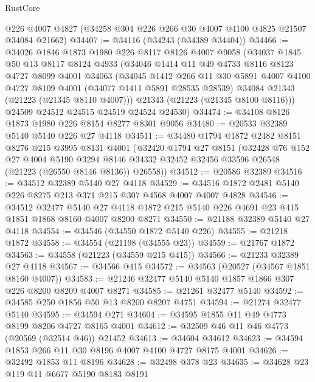 \begin{lexlean}{RustCore}
\begin{coremodule}
    @226
    @4007
    @4827
    (@34258 @304 @226 @266 @30 @4007 @4100 @4825 @21507 @34084 @21662)
@34407 := @34116 (@34243 (@34389 @34404))
@34466 := @34026
    @1846
    @1873
    @1980
    @226
    @8117
    @8126
    @4007
    @9058
    (@34037
      @1845
      @50
      @13
      @8117
      @8124
      @4933
      (@34046
        @1414
        @11
        @49
        @4733
        @8116
        @8123
        @4727
        @8099
        @4001
        @34063
        (@34045
          @1412
          @266
          @11
          @30
          @5891
          @4007
          @4100
          @4727
          @8109
          @4001
          (@34077 @1411 @5891 @28535 @28539)
          @34084
          @21343
          (@21223 (@21345 @8110 @4007)))
        @21343
        (@21223 (@21345 @8100 @8116)))
      @24509
      @24512
      @24515
      @24519
      @24524
      @24530)
@34474 := @34108 @8126 @1873 @1980 @226 @8154 @8277 @8301 @9056
@34480 := @20533 @32389 @5140 @5140 @226 @27 @4118
@34511 := @34480
    @1794
    @1872
    @2482
    @8151
    @8276
    @215
    @3995
    @8131
    @4001
    (@32420
      @1794
      @27
      @8151
      (@32428
        @76
        @152
        @27
        @4004
        @5190
        @3294
        @8146
        @34332
        @32452
        @32456
        @33596
        @26548
        (@21223 (@26550 @8146 @8136))
        @26558))
@34512 := @20586 @32389
@34516 := @34512 @32389 @5140 @27 @4118
@34529 := @34516 @1872 @2481 @5140 @226 @8275 @213 @371 @215 @307 @4568 @4007 @4007 @4828
@34546 := @34512
    @32477
    @5140
    @27
    @4118
    @1872
    @215
    @5140
    @226
    @4691
    @23
    @415
    @1851
    @1868
    @8160
    @4007
    @8200
    @8271
@34550 := @21188 @32389 @5140 @27 @4118
@34554 := @34546 (@34550 @1872 @5140 @226)
@34555 := @21218 @1872
@34558 := @34554 (@21198 (@34555 @23))
@34559 := @21767 @1872
@34563 := @34558 (@21223 (@34559 @215 @415))
@34566 := @21233 @32389 @27 @4118
@34567 := @34566 @415
@34572 := @34563 (@20527 (@34567 @1851 @8160 @4007))
@34583 := @21246 @32477 @5140 @5140 @1857 @1866 @307 @226 @8200 @8209 @4007 @8271
@34585 := @21261 @32477 @5140
@34592 := @34585 @250 @1856 @50 @13 @8200 @8207 @4751
@34594 := @21274 @32477 @5140
@34595 := @34594 @271
@34604 := @34595 @1855 @11 @49 @4773 @8199 @8206 @4727 @8165 @4001
@34612 := @32509 @46 @11 @46 @4773 (@20569 (@32514 @46)) @21452
@34613 := @34604 @34612
@34623 := @34594 @1853 @266 @11 @30 @8196 @4007 @4100 @4727 @8175 @4001
@34626 := @32492 @1853 @11 @8196
@34628 := @32498 @378 @23
@34635 := @34628 @23 @119 @11 @6677 @5190 @8183 @8191

\end{coremodule}
\end{lexlean}
